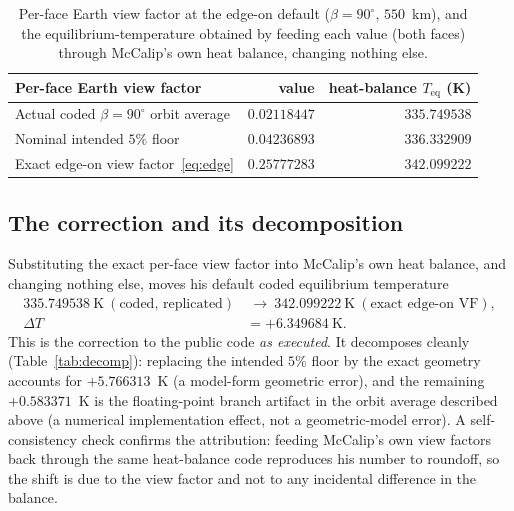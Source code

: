 \documentclass[11pt]{article}
\theoremstyle{remark}
\begin{document}
\begin{table}[t]
\centering
\caption{Per-face Earth view factor at the edge-on default ($\beta=90^{\circ}$,
$550$~km), and the equilibrium-temperature obtained by feeding each value (both
faces) through McCalip's own heat balance, changing nothing else.}
\label{tab:vf}
\begin{tabular}{lrr}
\toprule
Per-face Earth view factor & value & heat-balance $T_{\mathrm{eq}}$ (K) \\
\midrule
Actual coded $\beta=90^{\circ}$ orbit average & $0.02118447$ & $335.749538$ \\
Nominal intended $5\%$ floor                   & $0.04236893$ & $336.332909$ \\
Exact edge-on view factor~\eqref{eq:edge}      & $0.25777283$ & $342.099222$ \\
\bottomrule
\end{tabular}
\end{table}

\subsection{The correction and its decomposition}

Substituting the exact per-face view factor into McCalip's own heat balance, and
changing nothing else, moves his default coded equilibrium temperature
\begin{equation}
\begin{aligned}
335.749538\ \mathrm{K}\ (\text{coded, replicated})
&\ \longrightarrow\ 342.099222\ \mathrm{K}\ (\text{exact edge-on VF}),\\[2pt]
\Delta T &= +6.349684\ \mathrm{K}.
\end{aligned}
\label{eq:headline}
\end{equation}
This is the correction to the public code \emph{as executed}. It decomposes
cleanly (Table~\ref{tab:decomp}): replacing the intended $5\%$ floor by the exact
geometry accounts for $+5.766313$~K (a model-form geometric error), and the
remaining $+0.583371$~K is the floating-point branch artifact in the orbit average
described above (a numerical implementation effect, not a geometric-model error). A
self-consistency check confirms the attribution: feeding McCalip's own view
factors back through the same heat-balance code reproduces his number to roundoff,
so the shift is due to the view factor and not to any incidental difference in the
balance.
\end{document}
